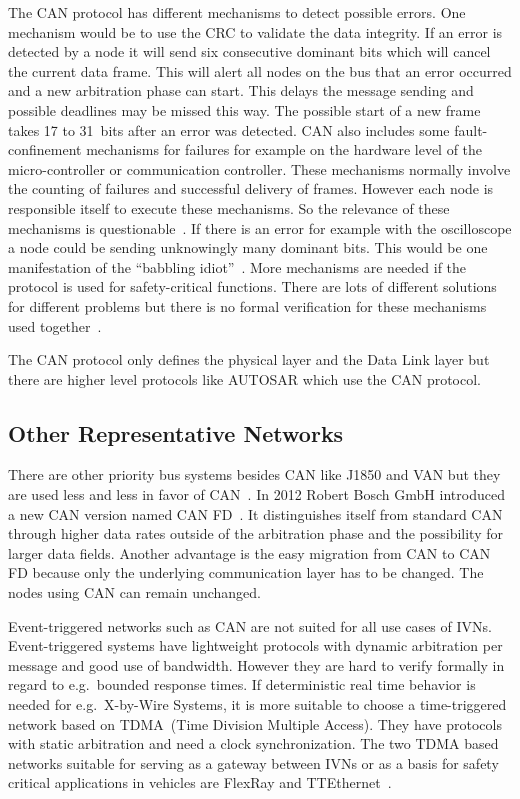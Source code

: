 The CAN protocol has different mechanisms to detect possible errors. One
mechanism would be to use the CRC to validate the data integrity. If an error is
detected by a node it will send six consecutive dominant bits which will cancel
the current data frame. This will alert all nodes on the bus that an error
occurred and a new arbitration phase can start. This delays the message sending
and possible deadlines may be missed this way. The possible start of a new frame
takes 17 to 31~bits after an error was detected. CAN also includes some
fault-confinement mechanisms for failures for example on the hardware level of
the micro-controller or communication controller. These mechanisms normally
involve the counting of failures and successful delivery of frames. However each
node is responsible itself to execute these mechanisms. So the relevance of
these mechanisms is questionable~\cite{Navet2017}. If there is an error for
example with the oscilloscope a node could be sending unknowingly many dominant
bits. This would be one manifestation of the ``babbling
idiot''~\cite{Pimentel2009}. More mechanisms are needed if the protocol is used
for safety-critical functions. There are lots of different solutions for
different problems but there is no formal verification for these mechanisms used
together~\cite{Navet2017}.

The CAN protocol only defines the physical layer and the Data Link layer but
there are higher level protocols like AUTOSAR which use the CAN protocol.

\subsection{Other Representative Networks}

There are other priority bus systems besides CAN like J1850 and VAN but they are
used less and less in favor of CAN~\cite{Navet2017}. In 2012 Robert Bosch GmbH
introduced a new CAN version named CAN FD~\cite{Hartwich2012}. It distinguishes
itself from standard CAN through higher data rates outside of the arbitration
phase and the possibility for larger data fields. Another advantage is the easy
migration from CAN to CAN FD because only the underlying communication layer has
to be changed. The nodes using CAN can remain unchanged.

Event-triggered networks such as CAN are not suited for all use cases of IVNs.
Event-triggered systems have lightweight protocols with dynamic arbitration per
message and good use of bandwidth. However they are hard to verify formally in
regard to e.g.\ bounded response times. If deterministic real time behavior is
needed for e.g.\ X-by-Wire Systems, it is more suitable to choose a
time-triggered network based on TDMA~(Time Division Multiple Access). They have
protocols with static arbitration and need a clock synchronization. The two TDMA
based networks suitable for serving as a gateway between IVNs or as a basis for
safety critical applications in vehicles are FlexRay and
TTEthernet~\cite{Navet2017}. 

